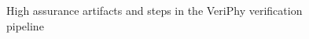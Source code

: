 \documentclass[12pt]{cmuthesis}
\theoremstyle{definition}
\theoremstyle{remark}
\newcommand{\Isabelle}{Isabelle/HOL\xspace}
\newcommand{\VeriPhy}{VeriPhy\xspace}
\begin{document}
\begin{figure}[tb]
%
%
%
%
\caption{High assurance artifacts and steps in the \VeriPhy verification pipeline}
\label{fig:pipelineoverview}
\end{figure}
\end{document}
